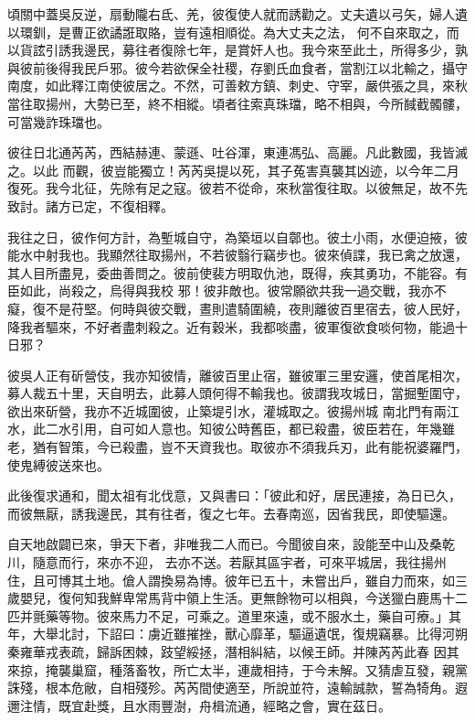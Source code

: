 \begin{pinyinscope}
 頃關中蓋吳反逆，扇動隴右氐、羌，彼復使人就而誘勸之。丈夫遺以弓矢，婦人遺以環釧，是曹正欲譎誑取賂，豈有遠相順從。為大丈夫之法，
 何不自來取之，而以貨詃引誘我邊民，募往者復除七年，是賞奸人也。我今來至此土，所得多少，孰與彼前後得我民戶邪。彼今若欲保全社稷，存劉氏血食者，當割江以北輸之，攝守南度，如此釋江南使彼居之。不然，可善敕方鎮、刺史、守宰，嚴供張之具，來秋當往取揚州，大勢已至，終不相縱。頃者往索真珠璫，略不相與，今所馘截髑髏，可當幾詐珠璫也。



 彼往日北通芮芮，西結赫連、蒙遜、吐谷渾，東連馮弘、高麗。凡此數國，我皆滅之。以此
 而觀，彼豈能獨立！芮芮吳提以死，其子菟害真襲其凶迹，以今年二月復死。我今北征，先除有足之寇。彼若不從命，來秋當復往取。以彼無足，故不先致討。諸方已定，不復相釋。



 我往之日，彼作何方計，為塹城自守，為築垣以自鄣也。彼土小雨，水便迫掖，彼能水中射我也。我顯然往取揚州，不若彼翳行竊步也。彼來偵諜，我已禽之放還，其人目所盡見，委曲善問之。彼前使裴方明取仇池，既得，疾其勇功，不能容。有臣如此，尚殺之，烏得與我校
 邪！彼非敵也。彼常願欲共我一過交戰，我亦不癡，復不是苻堅。何時與彼交戰，晝則遣騎圍繞，夜則離彼百里宿去，彼人民好，降我者驅來，不好者盡刺殺之。近有穀米，我都啖盡，彼軍復欲食啖何物，能過十日邪？



 彼吳人正有斫營伎，我亦知彼情，離彼百里止宿，雖彼軍三里安邏，使首尾相次，募人裁五十里，天自明去，此募人頭何得不輸我也。彼謂我攻城日，當掘塹圍守，欲出來斫營，我亦不近城圍彼，止築堤引水，灌城取之。彼揚州城
 南北門有兩江水，此二水引用，自可如人意也。知彼公時舊臣，都已殺盡，彼臣若在，年幾雖老，猶有智策，今已殺盡，豈不天資我也。取彼亦不須我兵刃，此有能祝婆羅門，使鬼縛彼送來也。



 此後復求通和，聞太祖有北伐意，又與書曰：「彼此和好，居民連接，為日已久，而彼無厭，誘我邊民，其有往者，復之七年。去春南巡，因省我民，即使驅還。



 自天地啟闢已來，爭天下者，非唯我二人而已。今聞彼自來，設能至中山及桑乾川，隨意而行，來亦不迎，
 去亦不送。若厭其區宇者，可來平城居，我往揚州住，且可博其土地。傖人謂換易為博。彼年已五十，未嘗出戶，雖自力而來，如三歲嬰兒，復何知我鮮卑常馬背中領上生活。更無餘物可以相與，今送獵白鹿馬十二匹并氈藥等物。彼來馬力不足，可乘之。道里來遠，或不服水土，藥自可療。」其年，大舉北討，下詔曰：虜近雖摧挫，獸心靡革，驅逼遺氓，復規竊暴。比得河朔秦雍華戎表疏，歸訴困棘，跂望綏拯，潛相糾結，以候王師。并陳芮芮此春
 因其來掠，掩襲巢窟，種落畜牧，所亡太半，連歲相持，于今未解。又猜虐互發，親黨誅殘，根本危敝，自相殘殄。芮芮間使適至，所說並符，遠輸誠款，誓為犄角。遐邇注情，既宜赴獎，且水雨豐澍，舟楫流通，經略之會，實在茲日。




\end{pinyinscope}
